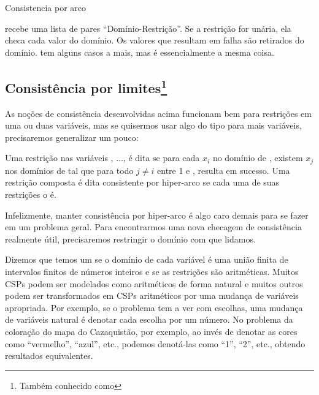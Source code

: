 \documentclass{article}
\begin{document}
    \begin{listing}
\inputminted{prolog}{../Exemplos/Cap9/arc_consistency.pl}\label{lst:arc_consistency}
\caption{Consistencia por arco}
    \end{listing}

 recebe uma lista de pares ``Domínio-Restrição''. Se a restrição for unária, ela checa cada valor do domínio.
Os valores que resultam em falha são retirados do domínio.  tem alguns casos a mais, mas é essencialmente a mesma coisa.

\subsection{Consistência por limites\footnote{Também conhecido como }}

As noções de consistência desenvolvidas acima funcionam bem para restrições em uma ou duas variáveis,
mas se quisermos usar algo do tipo para mais variáveis, precisaremos generalizar um pouco:

\begin{definition}
  Uma restrição  nas variáveis , ...,  é dita 
  se para cada $x_i$ no domínio de , existem $x_j$ nos domínios de  tal que
  para todo $j \neq i$ entre 1 e ,  resulta em
  sucesso. Uma restrição composta é dita consistente por hiper-arco se cada uma de suas restrições o é.
\end{definition}

Infelizmente, manter consistência por hiper-arco é algo caro demais para se fazer em um problema geral. Para
encontrarmos uma nova checagem de consistência realmente útil, precisaremos restringir o domínio com que lidamos.

Dizemos que temos um  se o domínio de cada variável é uma união
finita de intervalos finitos de números inteiros e se as restrições são aritméticas. Muitos CSPs
podem ser modelados como aritméticos de forma natural e muitos outros podem ser transformados em
CSPs aritméticos por uma mudança de variáveis apropriada.
Por exemplo, se o problema tem a ver com escolhas, uma mudança de variáveis natural é denotar cada
escolha por um número. No problema da coloração do mapa do Cazaquistão, por exemplo, ao invés de
denotar as cores como ``vermelho'', ``azul'', etc., podemos denotá-las como ``1'', ``2'', etc., obtendo resultados equivalentes.
\end{document}
